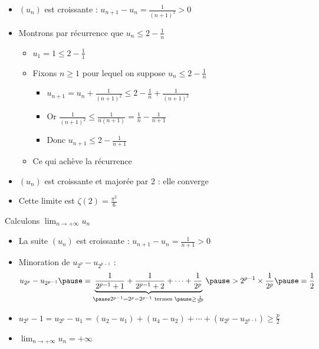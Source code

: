\begin{frame} 

\pause
\begin{itemize}
  \item  $(u_n)$ est croissante : $u_{n+1}-u_n= \frac{1}{(n+1)^2}>0$
\pause
  \item Montrons par récurrence que $u_n\leq 2 - \frac{1}{n}$
\pause  
  \begin{itemize}
    \item $u_1=1\leq 2 - \frac{1}{1}$
\pause    
    \item Fixons $n\geq 1$ pour lequel on suppose $u_n\leq 2 - \frac{1}{n}$
    \begin{itemize}
      \item $u_{n+1}=u_n+ \frac{1}{(n+1)^2}\leq  2 - \frac{1}{n}+ \frac{1}{(n+1)^2}$
      \item Or $\frac{1}{(n+1)^2}\leq \frac{1}{n(n+1)}=\frac{1}{n}-\frac{1}{n+1}$
      \item Donc $u_{n+1}\leq 2-\frac{1}{n+1}$
    \end{itemize}
\pause    
    \item Ce qui achève la récurrence 
  \end{itemize}

  \pause  
  \item $(u_n)$ est croissante et majorée par $2$ : elle converge

\pause 
  \item Cette limite est  $\zeta(2)=\frac{\pi^2}{6}$
\end{itemize}
\end{frame}

\begin{frame}

\bigskip
\pause


Calculons $\lim_{n\to +\infty} u_n$
\pause
\begin{itemize}
  \item La suite $(u_n)$ est croissante : $u_{n+1}-u_n= \frac{1}{n+1}>0$
\pause

  \item Minoration de $u_{2^p}-u_{2^{p-1}}$ :
  \pause
\[ u_{2^p}-u_{2^{p-1}}
\pause
=\underbrace{\frac{1}{2^{p-1}+1}+ \frac{1}{2^{p-1}+2}+\cdots+\frac{1}{2^p}}_{\pause 2^{p-1}
=2^p-2^{p-1}
\text{ termes }
\pause
\geq \frac{1}{2^p}}
\pause
> 2^{p-1}\times \frac{1}{2^p}
\pause
=\frac{1}{2}\]

\vspace*{-2ex}
\pause

  \item $ u_{2^p}-1 = u_{2^p}-u_1= (u_2 - u_1)+ (u_4 - u_2)+ \cdots +  (u_{2^p}-u_{2^{p-1}}) \geq \frac{p}{2} $


\pause

 \item $\lim_{n\to +\infty} u_n=+\infty$
\end{itemize}

\end{frame}

